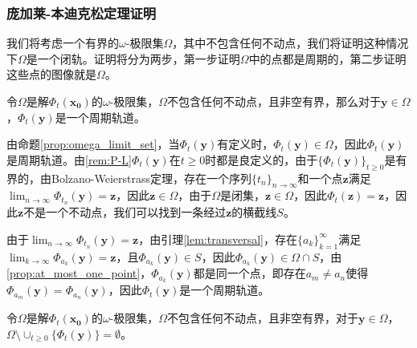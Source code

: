 \subsubsection{庞加莱-本迪克松定理证明}

我们将考虑一个有界的$\omega$-极限集$\Omega$，其中不包含任何不动点，我们将证明这种情况下$\Omega$是一个闭轨。证明将分为两步，第一步证明$\Omega$中的点都是周期的，第二步证明这些点的图像就是$\Omega$。
\begin{prop}\label{prop:periodic_orbit}
    令$\Omega$是解$\Phi_t(\mathbf{x_0})$的$\omega$-极限集，$\Omega$不包含任何不动点，且非空有界，那么对于$\mathbf{y}\in \Omega$，$\Phi_t(\mathbf{y})$是一个周期轨道。
\end{prop}
\begin{pf}
    由命题\ref{prop:omega_limit_set}，当$\Phi_t(\mathbf{y})$有定义时，$\Phi_t(\mathbf{y})\in \Omega$，因此$\Phi_t(\mathbf{y})$是周期轨道。由\ref{rem:P-L}$\Phi_t(\mathbf{y})$在$t\geq 0$时都是良定义的，由于$\{\Phi_t(\mathbf{y})\}_{t\geq 0}$是有界的，由Bolzano-Weierstrass定理，存在一个序列$\{t_n\}_{n\to\infty}$和一个点$\mathbf{z}$满足$\lim_{n\to\infty}\Phi_{t_n}(\mathbf{y})=\mathbf{z}$，因此$\mathbf{z}\in \Omega$，由于$\Omega$是闭集，$\mathbf{z}\in \Omega$，因此$\Phi_t(\mathbf{z})=\mathbf{z}$，因此$\mathbf{z}$不是一个不动点，我们可以找到一条经过$\mathbf{z}$的横截线$S$。

    由于$\lim_{n\to\infty}\Phi_{t_n}(\mathbf{y})=\mathbf{z}$，由引理\ref{lem:transversal}，存在$\{a_k\}_{k=1}^{\infty}$满足$\lim_{k\to\infty}\Phi_{a_k}(\mathbf{y})=\mathbf{z}$，且$\Phi_{a_k}(\mathbf{y})\in S$，因此$\Phi_{a_k}(\mathbf{y})\in \Omega\cap S$，由\ref{prop:at_most_one_point}，$\Phi_{a_k}(\mathbf{y})$都是同一个点，即存在$a_m\neq a_n$使得$\Phi_{a_m}(\mathbf{y})=\Phi_{a_n}(\mathbf{y})$，因此$\Phi_t(\mathbf{y})$是一个周期轨道。
\end{pf}
\begin{prop}\label{prop:closed_orbit}
    令$\Omega$是解$\Phi_t(\mathbf{x_0})$的$\omega$-极限集，$\Omega$不包含任何不动点，且非空有界，对于$\mathbf{y}\in\Omega$，$\Omega\setminus\cup_{t\geq 0}\{\Phi_t(\mathbf{y})\}=\emptyset$。
\end{prop}
